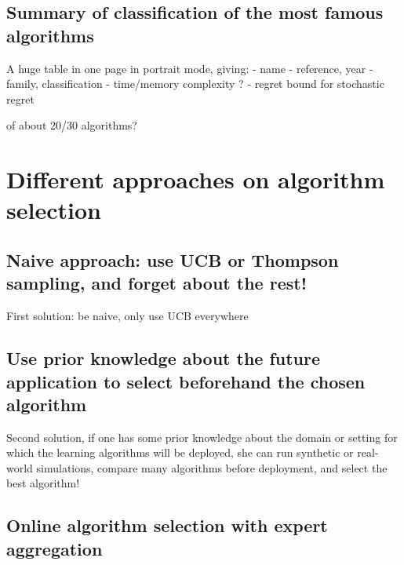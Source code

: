 \subsection{Summary of classification of the most famous algorithms}

A huge table in one page in portrait mode, giving:
- name
- reference, year
- family, classification
- time/memory complexity ?
- regret bound for stochastic regret

of about 20/30 algorithms?

\newpage

\section{Different approaches on algorithm selection}
\label{sec:2:chooseYourPreferredBanditAlgorithm}

\subsection{Naive approach: use UCB or Thompson sampling, and forget about the rest!}
First solution: be naive, only use UCB everywhere

\subsection{Use prior knowledge about the future application to select beforehand the chosen algorithm}
Second solution, if one has some prior knowledge about the domain or setting for which the learning algorithms will be deployed, she can run synthetic or real-world simulations, compare many algorithms before deployment, and select the best algorithm!

\subsection{Online algorithm selection with expert aggregation}





\newpage  %

